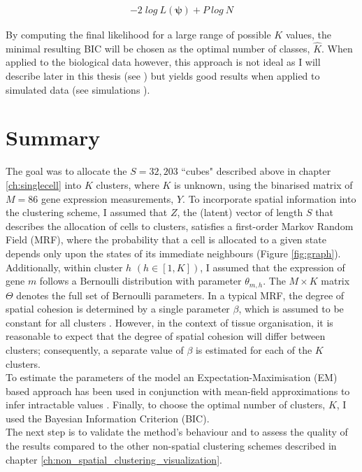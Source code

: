 \begin{align*}
\label{eq:BIC}
- 2\; log\:L(\boldsymbol{\psi}) + P\:log\:N
\end{align*}

By computing the final likelihood for a large range of possible $K$ values, the minimal resulting BIC will be chosen as the optimal number of classes, $\hat{K}$. When applied to the biological data however, this approach is not ideal as I will describe later in this thesis (see ) but yields good results when applied to simulated data (see simulations ).\\

\section{Summary}
The goal was to allocate the $S=32,203$ ``cubes" described above in chapter \ref{ch:singlecell} into $K$ clusters, where $K$ is unknown, using the binarised matrix of $M=86$ gene expression measurements, $Y$. To incorporate spatial information into the clustering scheme, I assumed that $Z$, the (latent) vector of length $S$ that describes the allocation of cells to clusters, satisfies a first-order Markov Random Field (MRF), where the probability that a cell is allocated to a given state depends only upon the states of its immediate neighbours (Figure \ref{fig:graph}). Additionally, within cluster $h$ $(h \in [1,K])$, I assumed that the expression of gene $m$ follows a Bernoulli distribution with parameter $\theta_{m,h}$. The $M \times K$ matrix  $\Theta$ denotes the full set of Bernoulli parameters. In a typical MRF, the degree of spatial cohesion is determined by a single parameter $\beta$, which is assumed to be constant for all clusters \cite{subudhi14,zhang14}. However, in the context of tissue organisation, it is reasonable to expect that the degree of spatial cohesion will differ between clusters; consequently,  a separate value of $\beta$ is estimated for each of the $K$ clusters.\\

To estimate the parameters of the model an Expectation-Maximisation (EM) based approach has been used in conjunction with mean-field approximations to infer intractable values \cite{Celeux01}. Finally, to choose the optimal number of clusters, $K$, I used the Bayesian Information Criterion (BIC).\\

The next step is to validate the method's behaviour and to assess the quality of the results compared to the other non-spatial clustering schemes described in chapter \ref{ch:non_spatial_clustering_visualization}.

